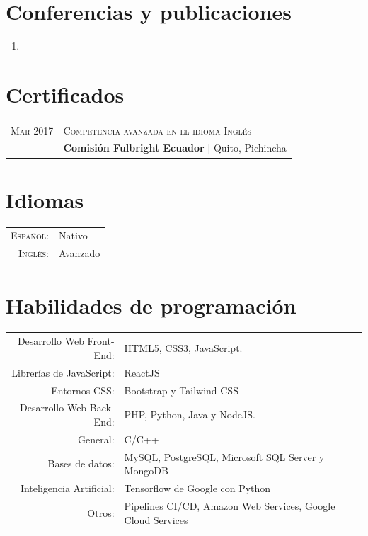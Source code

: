 \documentclass[a4paper,10.9pt]{article}
\begin{document}
\newpage
\section{Conferencias y publicaciones}
\begin{enumerate}
	\item {}
\end{enumerate}
	



\section{Certificados}
\begin{tabular}{r|l}	
 \textsc{Mar} 2017 &  \textsc{Competencia avanzada en el idioma Inglés}\\&
 \textbf{Comisión Fulbright Ecuador} | Quito, Pichincha\\

\end{tabular}

\section{Idiomas}
\begin{tabular}{rl}
 \textsc{Español:}&Nativo\\
\textsc{Inglés:}&Avanzado\\
\end{tabular}

\section{Habilidades de programación}
\begin{tabular}{rl}
 Desarrollo Web Front-End:& HTML5, CSS3, JavaScript.\\
 Librerías de JavaScript:& ReactJS\\
 Entornos CSS:& Bootstrap y Tailwind CSS\\
 Desarrollo Web Back-End:& PHP, Python, Java y NodeJS.\\
 General:& C/C++\\
 Bases de datos:& MySQL, PostgreSQL, Microsoft SQL Server y MongoDB\\
 Inteligencia Artificial:&  Tensorflow de Google con Python\\
 Otros:& Pipelines CI/CD, Amazon Web Services, Google Cloud Services
\end{tabular}
\end{document}

